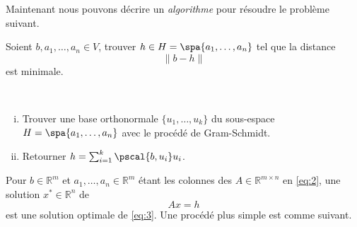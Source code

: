 


\noindent 
Maintenant nous pouvons décrire un \emph{algorithme} pour résoudre le problème suivant. 
\begin{framed}
  \noindent 
  Soient $b,a_1,\dots,a_n \in V$, trouver $h \in H = \spa \{a_1,\dots,a_n\}$ tel que la distance 
  \begin{displaymath}
    \|b - h\|
  \end{displaymath}
  est minimale. 
\end{framed}

\begin{algorithm}
\label{alg:2}

~\\
\begin{enumerate}[i)]
\item Trouver une base orthonormale $\{u_1,\dots,u_k\}$ du sous-espace $H = \spa\{a_1,\dots,a_n\}$ 
  avec le procédé de Gram-Schmidt. 
\item Retourner $ h = \sum_{i=1}^k \pscal{b,u_i} u_i$. 
\end{enumerate}
\end{algorithm}
\noindent 
Pour $b ∈ℝ^m$ et $a_1,\dots,a_n ∈ ℝ^m$ étant les colonnes des $A ∈ ℝ^{m ×n}$ en \eqref{eq:2},  une solution
$x^* ∈ℝ^n$ de
\begin{equation}
  \label{eq:53}
  Ax = h
\end{equation}
est une solution optimale de \eqref{eq:3}. Une procédé plus simple est comme suivant. 


